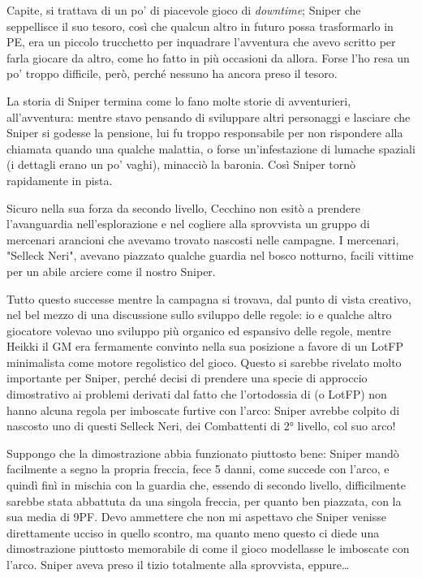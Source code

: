Capite, si trattava di un po' di piacevole gioco di \textit{downtime}; Sniper che seppellisce il suo tesoro, così che qualcun altro in futuro possa trasformarlo in PE, era un piccolo trucchetto per inquadrare l'avventura che avevo scritto per farla giocare da altro, come ho fatto in più occasioni da allora. Forse l'ho resa un po' troppo difficile, però, perché nessuno ha ancora preso il tesoro.

La storia di Sniper termina come lo fano molte storie di avventurieri, all'avventura: mentre stavo pensando di sviluppare altri personaggi e lasciare che Sniper si godesse la pensione, lui fu troppo responsabile per non rispondere alla chiamata quando una qualche malattia, o forse un'infestazione di lumache spaziali (i dettagli erano un po' vaghi), minacciò la baronia. Così Sniper tornò rapidamente in pista.

Sicuro nella sua forza da secondo livello, Cecchino non esitò a prendere l'avanguardia nell'esplorazione e nel cogliere alla sprovvista un gruppo di mercenari arancioni che avevamo trovato nascosti nelle campagne. I mercenari, "Selleck Neri", avevano piazzato qualche guardia nel bosco notturno, facili vittime per un abile arciere come il nostro Sniper.

Tutto questo successe mentre la campagna si trovava, dal punto di vista creativo, nel bel mezzo di una discussione sullo sviluppo delle regole: io e qualche altro giocatore volevao uno sviluppo più organico ed espansivo delle regole, mentre Heikki il GM era fermamente convinto nella sua posizione a favore di un LotFP minimalista come motore regolistico del gioco. Questo si sarebbe rivelato molto importante per Sniper, perché decisi di prendere una specie di approccio dimostrativo ai problemi derivati dal fatto che l'ortodossia di \dnd{} (o LotFP) non hanno alcuna regola per imboscate furtive con l'arco: Sniper avrebbe colpito di nascosto uno di questi Selleck Neri, dei Combattenti di 2° livello, col suo arco!

Suppongo che la dimostrazione abbia funzionato piuttosto bene: Sniper mandò facilmente a segno la propria freccia, fece 5 danni, come succede con l'arco, e quindì finì in mischia con la guardia che, essendo di secondo livello, difficilmente sarebbe stata abbattuta da una singola freccia, per quanto ben piazzata, con la sua media di 9PF. Devo ammettere che non mi aspettavo che Sniper venisse direttamente ucciso in quello scontro, ma quanto meno questo ci diede una dimostrazione piuttosto memorabile di come il gioco modellasse le imboscate con l'arco. Sniper aveva preso il tizio totalmente alla sprovvista, eppure\dots

